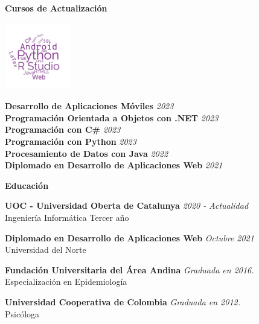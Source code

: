 \documentclass{resume} %
\begin{document}
\begin{rSection}{\textbf{\Large Cursos de Actualización}}
\begin{minipage}{0.3\textwidth}
    \includegraphics[width=110px]{wordcloud4.jpg}
\end{minipage}%
\begin{minipage}{0.7\textwidth}
    \textbf{Desarrollo de Aplicaciones Móviles} \emph{2023} \\
    \textbf{Programación Orientada a Objetos con .NET}  \emph{2023} \\
    \textbf{Programación con C\#} \emph{2023} \\
    \textbf{Programación con Python} \emph{2023} \\
    \textbf{Procesamiento de Datos con Java}  \emph{2022} \\
    \textbf{Diplomado en Desarrollo de Aplicaciones Web} \emph{2021}
\end{minipage}
\end{rSection}


\begin{rSection}{\textbf{\Large Educación}}

{\bf  UOC - Universidad Oberta de Catalunya} \hfill {\em 2020 - Actualidad} 
\\ Ingeniería Informática \hfill { Tercer año}


{\bf Diplomado en Desarrollo de Aplicaciones Web} \hfill {\em Octubre 2021} 
\\ Universidad del Norte  \hfill { }

{\bf  Fundación Universitaria del Área Andina} \hfill {\em Graduada en 2016.} 
\\ Especialización en Epidemiología \hfill {}

{\bf   Universidad Cooperativa de Colombia} \hfill {\em Graduada en 2012.} 
\\ Psicóloga \hfill {}


\end{rSection}
\end{document}
